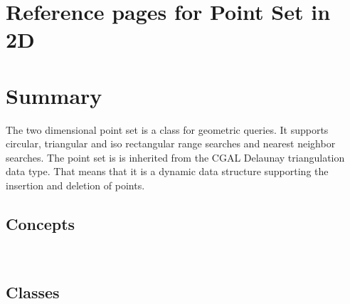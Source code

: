 

\ccParDims

\clearpage
\section{Reference pages for Point Set in 2D}

\section*{Summary}

The two dimensional point set is a class for geometric queries.
It supports circular, triangular and iso rectangular range searches and
nearest neighbor searches.
The point set is is inherited from the CGAL Delaunay triangulation data type.
That means that it is a dynamic data structure supporting the insertion and
deletion of points.

\subsection*{Concepts}
\\

\subsection*{Classes}
\\
\\

